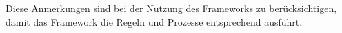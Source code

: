         Diese Anmerkungen sind bei der Nutzung des Frameworks zu berücksichtigen, damit das Framework die Regeln und Prozesse entsprechend ausführt. 
    
    
